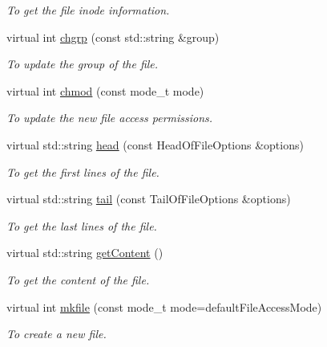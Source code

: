 \begin{DoxyCompactItemize}
\begin{DoxyCompactList}\small\item\em To get the file inode information. \item\end{DoxyCompactList}\item 
virtual int \hyperlink{classLocalFileProxy_a10dde3f07320a91da934b90b26150dee}{chgrp} (const std::string \&group)
\begin{DoxyCompactList}\small\item\em To update the group of the file. \item\end{DoxyCompactList}\item 
virtual int \hyperlink{classLocalFileProxy_a8f9ef7205b9c08b305052ff474cf18a1}{chmod} (const mode\_\-t mode)
\begin{DoxyCompactList}\small\item\em To update the new file access permissions. \item\end{DoxyCompactList}\item 
virtual std::string \hyperlink{classLocalFileProxy_aeab9747a068e7cd8df8a07f1a727bb31}{head} (const HeadOfFileOptions \&options)
\begin{DoxyCompactList}\small\item\em To get the first lines of the file. \item\end{DoxyCompactList}\item 
virtual std::string \hyperlink{classLocalFileProxy_aee171fefc216520156fd652b326bfb66}{tail} (const TailOfFileOptions \&options)
\begin{DoxyCompactList}\small\item\em To get the last lines of the file. \item\end{DoxyCompactList}\item 
virtual std::string \hyperlink{classLocalFileProxy_a496d5fb9be24c926478f814d868cbf50}{getContent} ()
\begin{DoxyCompactList}\small\item\em To get the content of the file. \item\end{DoxyCompactList}\item 
virtual int \hyperlink{classLocalFileProxy_a89c0787198641b84fd11cb295e0f721b}{mkfile} (const mode\_\-t mode=defaultFileAccessMode)
\begin{DoxyCompactList}\small\item\em To create a new file. \item\end{DoxyCompactList}\item 

\end{DoxyCompactItemize}
